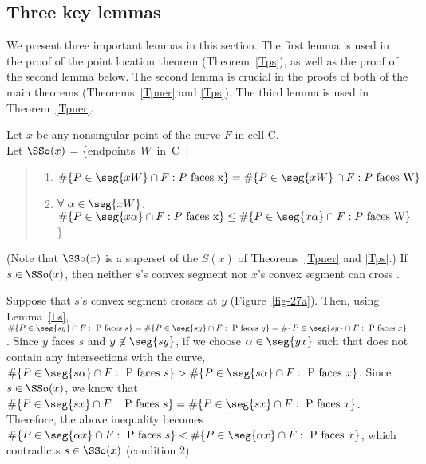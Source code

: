 
\subsection{Three key lemmas}

We present three important lemmas in this section.
The first lemma is used in the proof of the point location theorem (Theorem~\ref{Tps}),
as well as the proof of the second lemma below.
The second lemma is crucial in the proofs of both of the main theorems 
(Theorems~\ref{Tpner} and \ref{Tps}).
The third lemma is used in Theorem~\ref{Tpner}.

\begin{lemma}
\label{lem-argh}
Let $x$ be any nonsingular point of the curve $F$ in cell C.\\
Let $\SSo(x)$ = \mbox{\{endpoints $W$ in C $\mid$}
\begin{quote}
\begin{enumerate}
\item \mbox{$\#\{P \in\seg{xW}\cap F: P \mbox{ faces x}\} =
\#\{P \in \seg{xW}\cap F: P \mbox{ faces W} \}$}
\item $\forall\ \alpha \in \seg{xW}$,
$\#\{P \in\seg{x\alpha}\cap F: P \mbox{ faces x}\} \leq
\#\{P \in \seg{x\alpha}\cap F: P \mbox{ faces W}\} $
\}
\end{enumerate}
\end{quote}
(Note that $\SSo(x)$ is a superset of the $S(x)$ of Theorems~\ref{Tpner} and \ref{Tps}.)
If $s \in \SSo(x)$, then neither $s$'s convex segment nor $x$'s convex 
segment can cross .
\end{lemma}
Suppose that $s$'s convex segment crosses  at $y$ (Figure~\ref{fig-27a}).
Then, using Lemma~\ref{Ls}, $\#\{P \in \seg{sy} \cap F: \mbox{ P faces $s$}\} = 
\#\{P \in \seg{sy} \cap F: \mbox{ P faces $y$}\} =
\#\{P \in \seg{sy} \cap F: \mbox{ P faces $x$}\}$.
Since $y$ faces $s$ and $y \not\in \seg{sy}$, 
if we choose $\alpha \in \seg{yx}$ such that  
does not contain any intersections with the curve, 
$\#\{P \in \seg{s\alpha} \cap F: \mbox{ P faces $s$}\} >
\#\{P \in \seg{s\alpha} \cap F: \mbox{ P faces $x$}\}$.
Since $s \in \SSo(x)$, we know that 
$\#\{P \in \seg{sx} \cap F: \mbox{ P faces $s$}\} =
\#\{P \in \seg{sx} \cap F: \mbox{ P faces $x$}\}$.
Therefore, the above inequality 
becomes $\#\{P \in \seg{\alpha x} \cap F: \mbox{ P faces $s$}\} <
\#\{P \in \seg{\alpha x} \cap F: \mbox{ P faces $x$}\}$, 
which contradicts $s \in \SSo(x)$ (condition 2).

